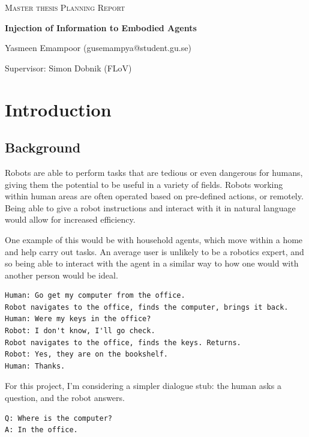 \documentclass{article}
\begin{document}
\begin{titlepage}
  

\centering
  
  
{\scshape\LARGE Master thesis Planning Report\\}
  
\vspace{0.5cm}
  
{\huge\bfseries Injection of Information to Embodied Agents\\}

  
\vspace{2cm}
  
{\Large Yasmeen Emampoor (gusemampya@student.gu.se)\\}
  
\vspace{1.0cm}
  
{\large Supervisor: Simon Dobnik (FLoV)\\}
  
\vspace{1.5cm}

\end{titlepage}
  
\section{Introduction}
\subsection{Background}
Robots are able to perform tasks that are tedious or even dangerous for humans, giving them the potential to be useful in a variety of fields. Robots working within human areas are often operated based on pre-defined actions, or remotely. Being able to give a robot instructions and interact with it in natural language would allow for increased efficiency. 

One example of this would be with household agents, which move within a home and help carry out tasks. An average user is unlikely to be a robotics expert, and so being able to interact with the agent in a similar way to how one would with another person would be ideal.

\begin{verbatim}
Human: Go get my computer from the office. 
Robot navigates to the office, finds the computer, brings it back. 
Human: Were my keys in the office?
Robot: I don't know, I'll go check. 
Robot navigates to the office, finds the keys. Returns.
Robot: Yes, they are on the bookshelf. 
Human: Thanks. 
\end{verbatim}
For this project, I'm considering a simpler dialogue stub: the human asks a question, and the robot answers. 
\begin{verbatim}
Q: Where is the computer?
A: In the office. 
\end{verbatim}
\end{document}
